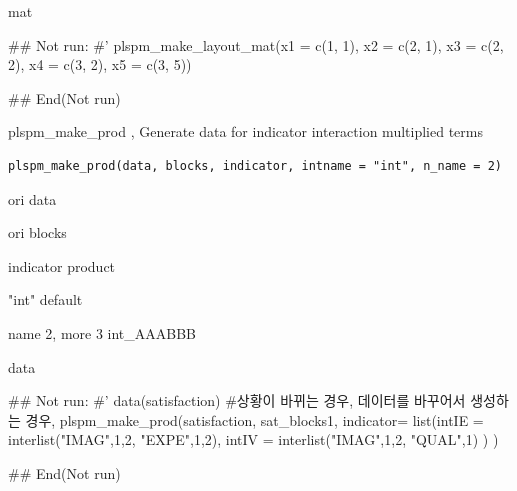 \documentclass[a4paper]{book}
\begin{document}
%
\begin{Value}
mat
\end{Value}
%
\begin{Examples}
\begin{ExampleCode}

\#\# Not run: 
#'
plspm_make_layout_mat(x1 = c(1, 1),
                      x2 = c(2, 1),
                      x3 = c(2, 2),
                      x4 = c(3, 2),
                      x5 = c(3, 5))

## End(Not run)


\end{ExampleCode}
\end{Examples}
%
\begin{Description}
plspm\_make\_prod , Generate data for indicator interaction multiplied terms
\end{Description}
%
\begin{Usage}
\begin{verbatim}
plspm_make_prod(data, blocks, indicator, intname = "int", n_name = 2)
\end{verbatim}
\end{Usage}
%
\begin{Arguments}
\begin{ldescription}
\item[\code{data}] ori data

\item[\code{blocks}] ori blocks

\item[\code{indicator}] indicator product

\item[\code{intname}] "int" default

\item[\code{n\_name}] name 2, more 3  int\_AAABBB
\end{ldescription}
\end{Arguments}
%
\begin{Value}
data
\end{Value}
%
\begin{Examples}
\begin{ExampleCode}

\#\# Not run: 
#' data(satisfaction)
#상황이 바뀌는 경우, 데이터를 바꾸어서 생성하는 경우,
plspm_make_prod(satisfaction,
                sat_blocks1,
                indicator= list(intIE = interlist("IMAG",1,2, "EXPE",1,2),
                                intIV = interlist("IMAG",1,2, "QUAL",1)  )
) %

## End(Not run)

\end{ExampleCode}
\end{Examples}
\end{document}
